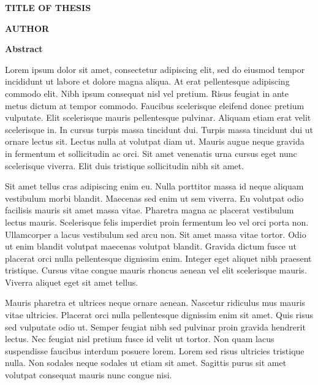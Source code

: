 \thispagestyle{empty}

\begin{center}
\textbf{\Huge{TITLE OF THESIS}}
\vspace{0.75cm}

	\Large{\textbf{AUTHOR}}
	\vspace{0.75cm}
	
	\large{\textbf{Abstract}}
\end{center}
\vspace{0.25cm}

Lorem ipsum dolor sit amet, consectetur adipiscing elit, sed do eiusmod tempor incididunt ut labore et dolore magna aliqua. At erat pellentesque adipiscing commodo elit. Nibh ipsum consequat nisl vel pretium. Risus feugiat in ante metus dictum at tempor commodo. Faucibus scelerisque eleifend donec pretium vulputate. Elit scelerisque mauris pellentesque pulvinar. Aliquam etiam erat velit scelerisque in. In cursus turpis massa tincidunt dui. Turpis massa tincidunt dui ut ornare lectus sit. Lectus nulla at volutpat diam ut. Mauris augue neque gravida in fermentum et sollicitudin ac orci. Sit amet venenatis urna cursus eget nunc scelerisque viverra. Elit duis tristique sollicitudin nibh sit amet.

Sit amet tellus cras adipiscing enim eu. Nulla porttitor massa id neque aliquam vestibulum morbi blandit. Maecenas sed enim ut sem viverra. Eu volutpat odio facilisis mauris sit amet massa vitae. Pharetra magna ac placerat vestibulum lectus mauris. Scelerisque felis imperdiet proin fermentum leo vel orci porta non. Ullamcorper a lacus vestibulum sed arcu non. Sit amet massa vitae tortor. Odio ut enim blandit volutpat maecenas volutpat blandit. Gravida dictum fusce ut placerat orci nulla pellentesque dignissim enim. Integer eget aliquet nibh praesent tristique. Cursus vitae congue mauris rhoncus aenean vel elit scelerisque mauris. Viverra aliquet eget sit amet tellus.

Mauris pharetra et ultrices neque ornare aenean. Nascetur ridiculus mus mauris vitae ultricies. Placerat orci nulla pellentesque dignissim enim sit amet. Quis risus sed vulputate odio ut. Semper feugiat nibh sed pulvinar proin gravida hendrerit lectus. Nec feugiat nisl pretium fusce id velit ut tortor. Non quam lacus suspendisse faucibus interdum posuere lorem. Lorem sed risus ultricies tristique nulla. Non sodales neque sodales ut etiam sit amet. Sagittis purus sit amet volutpat consequat mauris nunc congue nisi.